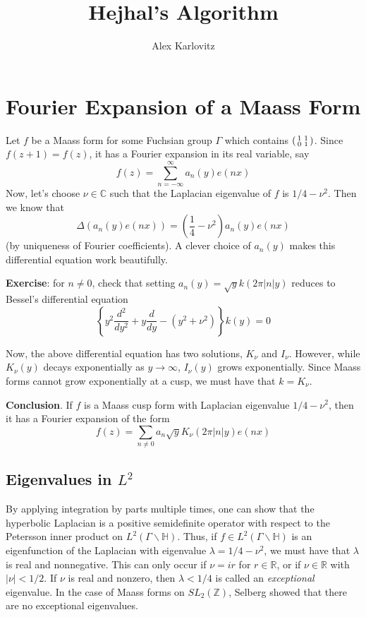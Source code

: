 \documentclass[]{article}
\title{Hejhal's Algorithm}
\author{Alex Karlovitz}
\date{}
\begin{document}
	
	\maketitle

\section*{Fourier Expansion of a Maass Form}

Let $f$ be a Maass form for some Fuchsian group $\Gamma$ which contains
$\begin{psmallmatrix}
	1 & 1 \\
	0 & 1
\end{psmallmatrix}$.
Since $f(z + 1) = f(z)$, it has a Fourier expansion in its real variable, say
$$
f(z) = \sum_{n=-\infty}^{\infty}a_n(y)e(nx)
$$
Now, let's choose $\nu \in \mathbb{C}$ such that the Laplacian eigenvalue of $f$ is $1/4 - \nu^2$.
Then we know that
$$
\Delta(a_n(y)e(nx)) = \left(\frac{1}{4} - \nu^2\right)a_n(y)e(nx)
$$
(by uniqueness of Fourier coefficients).
A clever choice of $a_n(y)$ makes this differential equation work beautifully.

\textbf{Exercise}: for $n \neq 0$, check that setting $a_n(y) = \sqrt{y}k(2\pi|n|y)$ reduces to Bessel's differential equation
$$
\left\{ y^2\frac{d^2}{dy^2} + y\frac{d}{dy} - (y^2 + \nu^2) \right\}k(y) = 0
$$

Now, the above differential equation has two solutions, $K_\nu$ and $I_\nu$.
However, while $K_\nu(y)$ decays exponentially as $y \rightarrow\infty$, $I_\nu(y)$ grows exponentially.
Since Maass forms cannot grow exponentially at a cusp, we must have that $k = K_\nu$.

\textbf{Conclusion}.
If $f$ is a Maass cusp form with Laplacian eigenvalue $1/4 - \nu^2$, then it has a Fourier expansion of the form
$$
f(z) = \sum_{n\neq0}a_n\sqrt{y}K_\nu(2\pi|n|y)e(nx)
$$

\subsection*{Eigenvalues in $L^2$}

By applying integration by parts multiple times, one can show that the hyperbolic Laplacian is a positive semidefinite operator with respect to the Petersson inner product on $L^2(\Gamma\backslash\mathbb{H})$.
Thus, if $f \in L^2(\Gamma\backslash\mathbb{H})$ is an eigenfunction of the Laplacian with eigenvalue $\lambda = 1/4 - \nu^2$, we must have that $\lambda$ is real and nonnegative.
This can only occur if $\nu = ir$ for $r \in \mathbb{R}$, or if $\nu \in \mathbb{R}$ with $|\nu| < 1/2$.
If $\nu$ is real and nonzero, then $\lambda < 1/4$ is called an \textit{exceptional} eigenvalue.
In the case of Maass forms on $SL_2(\mathbb{Z})$, Selberg \cite{selberg} showed that there are no exceptional eigenvalues.
\end{document}
